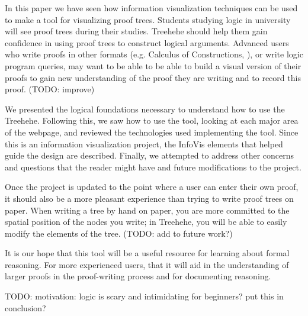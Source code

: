 \documentclass[conference]{IEEEtran}
\newcommand{\projectname}{Treehehe}
\begin{document}

In this paper we have seen how information visualization techniques can be used to make a tool for visualizing proof trees. Students studying logic in university will see proof trees during their studies. \projectname{} should help them gain confidence in using proof trees to construct logical arguments. Advanced users who write proofs in other formats (e.g. Calculus of Constructions, ), or write logic program queries, may want to be able to be able to build a visual version of their proofs to gain new understanding of the proof they are writing and to record this proof. (TODO: improve)

We presented the logical foundations necessary to understand how to use the \projectname{}. Following this, we saw how to use the tool, looking at each major area of the webpage, and reviewed the technologies used implementing the tool. Since this is an information visualization project, the InfoVis elements that helped guide the design are described. Finally, we attempted to address other concerns and questions that the reader might have and future modifications to the project.


Once the project is updated to the point where a user can enter their own proof, it should also be a more pleasant experience than trying to write proof trees on paper. When writing a tree by hand on paper, you are more committed to the spatial position of the nodes you write; in \projectname{}, you will be able to easily modify the elements of the tree. (TODO: add to future work?)

It is our hope that this tool will be a useful resource for learning about formal reasoning. For more experienced users, that it will aid in the understanding of larger proofs in the proof-writing process and for documenting reasoning.


TODO: motivation: logic is scary and intimidating for beginners? put this in conclusion?

\end{document}
